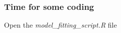\documentclass{beamer}
\begin{document}
 \section*{}
 
 \begin{frame}
  \frametitle{\bf Time for some coding}
  
 \begin{center}
  Open the \textit{model\_fitting\_script.R} file
 \end{center}
 
\end{frame}
 
\end{document}
